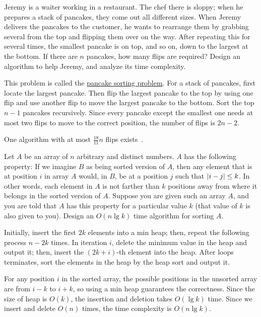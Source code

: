 \begin{Exercise}[title={Pancake sorting problem},origin={NCKU CSIE 102},difficulty=1]
Jeremy is a waiter working in a restaurant. The chef there is sloppy; when he prepares a stack of pancakes, they come out all different sizes. When Jeremy delivers the pancakes to the customer, he wants to rearrange them by grabbing several from the top and flipping them over on the way. After repeating this for several times, the smallest pancake is on top, and so on, down to the largest at the bottom. If there are $n$ pancakes, how many flips are required? Design an algorithm to help Jeremy, and analyze its time complexity.
\end{Exercise}
\begin{Answer}
This problem is called the \href{https://en.wikipedia.org/wiki/Pancake_sorting}{pancake sorting problem}. For a stack of pancakes, first locate the largest pancake. Then flip the largest pancake to the top by using one flip and use another flip to move the largest pancake to the bottom. Sort the top $n-1$ pancakes recursively. Since every pancake except the smallest one needs at most two flips to move to the correct position, the number of flips is $2n - 2$.

\begin{remark}
One algorithm with at most $\frac{18}{11}n$ flips exists~\cite{Chitturi2009}.
\end{remark}
\end{Answer}

\begin{Exercise}[origin={NTUT CSIE 95}]
Let $A$ be an array of $n$ arbitrary and distinct numbers. $A$ has the following property: If we imagine $B$ as being sorted version of $A$, then any element that is at position $i$ in array $A$ would, in $B$, be at a position $j$ such that $\lvert i - j\rvert \leq k$. In other words, each element in $A$ is not farther than $k$ positions away from where it belongs in the sorted version of $A$. Suppose you are given such an array $A$, and you are told that $A$ has this property for a particular value $k$ (that value of $k$ is also given to you). Design an $O(n \lg k)$ time algorithm for sorting $A$.
\end{Exercise}
\begin{Answer}
Initially, insert the first $2k$ elements into a min heap; then, repeat the following process $n - 2k$ times. In iteration $i$, delete the minimum value in the heap and output it; then, insert the $(2k + i)$-th element into the heap. After loops terminates, sort the elements in the heap by the heap sort and output it.

For any position $i$ in the sorted array, the possible positions in the unsorted array are from $i - k$ to $i + k$, so using a min heap guarantees the correctness. 
Since the size of heap is $O(k)$, the insertion and deletion takes $O(\lg k)$ time. 
Since we insert and delete $O(n)$ times, the time complexity is $O(n \lg k)$.
\end{Answer}

